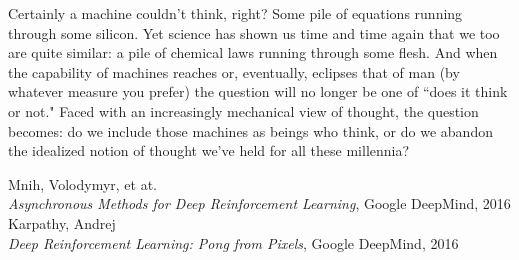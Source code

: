 \documentclass{article}
\begin{document}
Certainly a machine couldn't think, right? Some pile of equations running through some silicon. Yet science has shown us time and time again that we too are quite similar: a pile of chemical laws running through some flesh. And when the capability of machines reaches or, eventually, eclipses that of man (by whatever measure you prefer) the question will no longer be one of ``does it think or not." Faced with an increasingly mechanical view of thought, the question becomes: do we include those machines as beings who think, or do we abandon the idealized notion of thought we've held for all these millennia?

\begin{thebibliography}{999}
  Mnih, Volodymyr, et at.\\
  \emph{Asynchronous Methods for Deep Reinforcement Learning}, Google DeepMind, 2016
  Karpathy, Andrej\\
  \emph{Deep Reinforcement Learning: Pong from Pixels}, Google DeepMind, 2016
\end{thebibliography}
\end{document}
